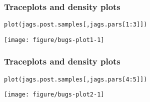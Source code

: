 \documentclass[color=usenames,dvipsnames]{beamer}\usepackage[]{graphicx}\usepackage[]{color}
\makeatletter
\newcommand{\hlnum}[1]{\textcolor[rgb]{0.69,0.494,0}{#1}}%
\newcommand{\hlopt}[1]{\textcolor[rgb]{0,0,0}{#1}}%
\newcommand{\hlstd}[1]{\textcolor[rgb]{0,0,0}{#1}}%
\newcommand{\hlkwd}[1]{\textcolor[rgb]{0.004,0.004,0.506}{#1}}%
\newenvironment{kframe}{%
 \def\at@end@of@kframe{}%
 \ifinner\ifhmode%
  \def\at@end@of@kframe{\end{minipage}}%
  \begin{minipage}{\columnwidth}%
 \fi\fi%
 \def\FrameCommand##1{\hskip\@totalleftmargin \hskip-\fboxsep
 \colorbox{shadecolor}{##1}\hskip-\fboxsep
     \hskip-\linewidth \hskip-\@totalleftmargin \hskip\columnwidth}%
 \MakeFramed {\advance\hsize-\width
   \@totalleftmargin\z@ \linewidth\hsize
   \@setminipage}}%
 {\par\unskip\endMakeFramed%
 \at@end@of@kframe}
\newenvironment{knitrout}{}{} %
\makeatother
\begin{document}
\begin{frame}[fragile]
  \frametitle{Traceplots and density plots}
\begin{knitrout}\footnotesize
{}\color{fgcolor}\begin{kframe}
\begin{alltt}
\hlkwd{plot}\hlstd{(jags.post.samples[,jags.pars[}\hlnum{1}\hlopt{:}\hlnum{3}\hlstd{]])}
\end{alltt}
\end{kframe}

{\centering \texttt{[image: figure/bugs-plot1-1]} 

}



\end{knitrout}
\end{frame}



\begin{frame}[fragile]
  \frametitle{Traceplots and density plots}
\begin{knitrout}\footnotesize
{}\color{fgcolor}\begin{kframe}
\begin{alltt}
\hlkwd{plot}\hlstd{(jags.post.samples[,jags.pars[}\hlnum{4}\hlopt{:}\hlnum{5}\hlstd{]])}
\end{alltt}
\end{kframe}

{\centering \texttt{[image: figure/bugs-plot2-1]} 

}



\end{knitrout}
\end{frame}
\end{document}
